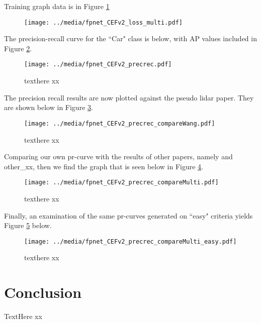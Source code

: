 Training graph data is in Figure \ref{fpnet_CEFv2_loss_multi}

\begin{figure}[ht]
	\centering
	\texttt{[image: ../media/fpnet\_CEFv2\_loss\_multi.pdf]}
	\caption{}
	\label{fpnet_CEFv2_loss_multi}
\end{figure}


The precision-recall curve for the ``Car" class is below, with AP values included in Figure \ref{fpnet_CEFv2_precrec}.

\begin{figure}[ht]
	\centering
	\texttt{[image: ../media/fpnet\_CEFv2\_precrec.pdf]}
	\caption{texthere xx}
	\label{fpnet_CEFv2_precrec}
\end{figure}

The precision recall results are now plotted against the pseudo lidar paper. They are shown below in Figure \ref{fpnet_CEFv2_precrec_compareWang}.

\begin{figure}[H]
	\centering
	\texttt{[image: ../media/fpnet\_CEFv2\_precrec\_compareWang.pdf]}
	\caption{texthere xx}
	\label{fpnet_CEFv2_precrec_compareWang}
\end{figure}


Comparing our own pr-curve with the results of other papers, namely \cite{wang_pseudo-lidar_2019} and other\_xx, then we find the graph that is seen below in Figure \ref{fpnet_CEFv2_precrec_compareMulti}.



\begin{figure}[H]
	\centering
	\texttt{[image: ../media/fpnet\_CEFv2\_precrec\_compareMulti.pdf]}
	\caption{texthere xx}
	\label{fpnet_CEFv2_precrec_compareMulti}
\end{figure}

Finally, an examination of the same pr-curves generated on ``easy" criteria yields Figure \ref{fpnet_CEFv2_precrec_compareMulti_easy} below.

\begin{figure}[H]
	\centering
	\texttt{[image: ../media/fpnet\_CEFv2\_precrec\_compareMulti\_easy.pdf]}
	\caption{texthere xx}
	\label{fpnet_CEFv2_precrec_compareMulti_easy}
\end{figure}

\newpage
\section{Conclusion}
TextHere xx
